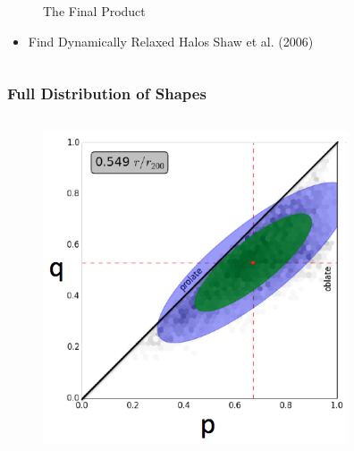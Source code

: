\documentclass[hyperref={pdfpagelabels=false}]{beamer}
\begin{document}
\begin{frame}
\begin{columns}
\begin{column}{0.5\textwidth}
\begin{figure}
        \caption{The Final Product}
      \end{figure}
      \begin{itemize}
      \item Find Dynamically Relaxed Halos {\tiny Shaw et al. (2006)}
      \end{itemize}
    \end{column}
  \end{columns}
\end{frame}

\begin{frame}
\frametitle{Full Distribution of Shapes}
\begin{columns}
  \begin{column}{0.5\textwidth}
    \begin{figure}
      \includegraphics[width=\textwidth]{LMSingleVirialHalf.png}
    \end{figure}  
  \end{column}
  \begin{column}{0.5\textwidth}
    \begin{figure}

\end{figure}
\end{column}
\end{columns}
\end{frame}
\end{document}
